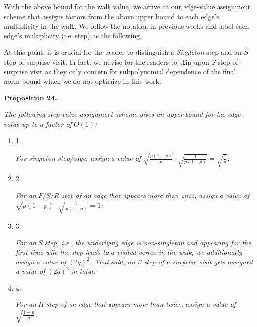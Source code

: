 \documentclass[10pt,a4paper]{article}
\begin{document}
With the above bound for the walk value, we arrive at our edge-value assignment scheme that assigns factors from the above upper bound to each edge’s multiplicity in the walk. We follow the notation in previous works and label each edge’s multiplicity (i.e. step) as the following,\par




At this point, it is crucial for the reader to distinguish a \emph{Singleton} step and an $S$ step of surprise visit. In fact, we advise for the readers to skip upon $S$ step of surprise visit as they only concern for subpolynomial dependence of the final norm bound which we do not optimize in this work.\par





\par\medskip\noindent\textbf{
\textbf{Proposition 24}\textbf{.}
}\par



\emph{The following step-value assignment scheme gives an upper bound for the edge-value up to a factor of $O(1)$:}\par


\begin{enumerate}


\item[] 
1. 


\emph{For singleton step/edge, assign a value of }$\sqrt{\frac{p(1-p)}{n}}\cdot\sqrt{\frac{1}{p(1-p)}}=\sqrt{\frac{1}{n}}$\emph{;}\par





\item[] 
2. 


\emph{For an }$F/S/R$\emph{ step of an edge that appears more than once, assign a value of }$\sqrt{p(1-p)}\cdot\sqrt{\frac{1}{p(1-p)}}=1$\emph{;}\par





\item[] 
3. 


\emph{For an }$S$\emph{ step, i.e., the underlying edge is non-singleton and appearing for the first time wile the step leads to a visited vertex in the walk, we additionally assign a value of }$(2q)^{2}$\emph{. That said, an }$S$\emph{ step of a surprise visit gets assigned a value of }$(2q)^{2}$\emph{ in total;}\par





\item[] 
4. 


\emph{For an }$H$\emph{ step of an edge that appears more than twice, assign a value of }$\sqrt{\frac{1-p}{p}}$\emph{.}\par





\end{enumerate}
\end{document}
